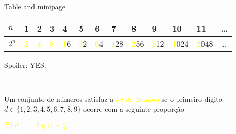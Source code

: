     
\begin{frame}{Table and minipage}

\begin{center}
\begin{tabular}{|l|l|l|l|l|l|l|l|l|l|l|l|l|}
\hline
\(n\) & 1  & 2 & 3 & 4 & 5 & 6 & 7 & 8 & 9 & 10 & 11 & \ldots       \\ \hline
\(2^n\) & \textcolor{yellow}{2} & \textcolor{yellow}{4} & \textcolor{yellow}{8} & \textcolor{yellow}{1}6 & \textcolor{yellow}{3}2 & \textcolor{yellow}{6}4 & \textcolor{yellow}{1}28 &  \textcolor{yellow}{2}56 & \textcolor{yellow}{5}12 & \textcolor{yellow}{1}024 & \textcolor{yellow}{2}048 & \ldots    \\ \hline
\end{tabular}
\end{center}

\pause 

\bigskip

\begin{center}
\textcolor{yellow}{}
\bigskip

\pause \tiny Spoiler: \textcolor{green2}{YES}.

\end{center}


\pause 
\bigskip
\small 
\
\pause 
\begin{minipage}{0.47\textwidth}
    Um conjunto de números satisfaz a \emph{\textcolor{yellow}{lei de Benford}} se o primeiro dígito \(d \in \{1,2,3,4,5,6,7,8,9\} \) ocorre com a seguinte proporção 
\end{minipage}
\begin{minipage}{0.47\textwidth}
    \centering  \textcolor{yellow}{\(P(d) = \log\bigg(1+ \frac{1}{d}\bigg) \)} 
\end{minipage}
\end{frame}
